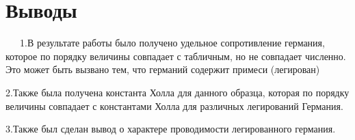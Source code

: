 \documentclass[a4paper,12pt]{article}
\begin{document}
\section{Выводы}

\ \ \ 1.В результате работы было получено удельное сопротивление германия, которое по порядку величины совпадает с табличным, но не совпадает численно. Это может быть вызвано тем, что германий содержит примеси (легирован)

2.Также была получена константа Холла для данного образца, которая по порядку величины совпадает с константами Холла для различных легирований Германия.

3.Также был сделан вывод о характере проводимости легированного германия.
\end{document}
